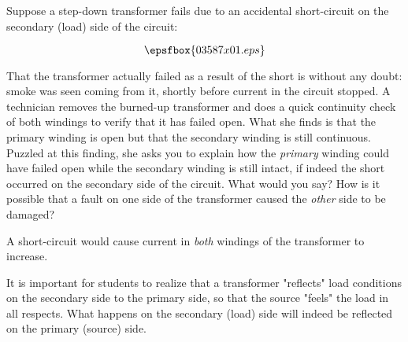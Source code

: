 

Suppose a step-down transformer fails due to an accidental short-circuit on the secondary (load) side of the circuit:

$$\epsfbox{03587x01.eps}$$

That the transformer actually failed as a result of the short is without any doubt: smoke was seen coming from it, shortly before current in the circuit stopped.  A technician removes the burned-up transformer and does a quick continuity check of both windings to verify that it has failed open.  What she finds is that the primary winding is open but that the secondary winding is still continuous.  Puzzled at this finding, she asks you to explain how the {\it primary} winding could have failed open while the secondary winding is still intact, if indeed the short occurred on the secondary side of the circuit.  What would you say?  How is it possible that a fault on one side of the transformer caused the {\it other} side to be damaged?







A short-circuit would cause current in {\it both} windings of the transformer to increase.







It is important for students to realize that a transformer "reflects" load conditions on the secondary side to the primary side, so that the source "feels" the load in all respects.  What happens on the secondary (load) side will indeed be reflected on the primary (source) side.




